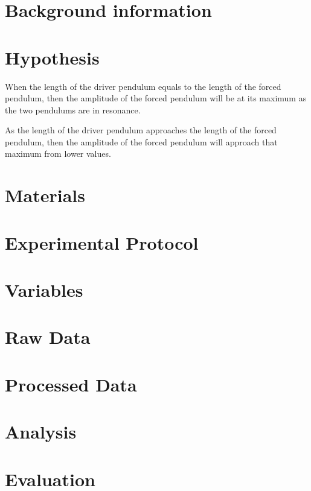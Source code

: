 \documentclass[letterpaper, 12pt]{article}
\begin{document}
\section{Background information}



\section{Hypothesis}

When the length of the driver pendulum equals to the length of the forced pendulum,
then the amplitude of the forced pendulum will be at its maximum as the two pendulums
are in resonance.

As the length of the driver pendulum approaches the length of the forced pendulum,
then the amplitude of the forced pendulum will approach that maximum from lower values.

\section{Materials}

\section{Experimental Protocol}

\section{Variables}

\section{Raw Data}

\section{Processed Data}

\section{Analysis}

\section{Evaluation}



\end{document}
